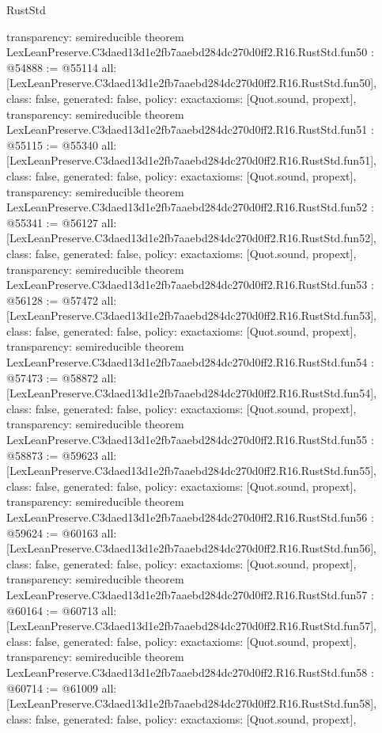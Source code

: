 \begin{lexlean}{RustStd}
\begin{coremodule}
{  transparency: semireducible
}
theorem LexLeanPreserve.C3daed13d1e2fb7aaebd284dc270d0ff2.R16.RustStd.fun50 : @54888 := @55114 {
  all: [LexLeanPreserve.C3daed13d1e2fb7aaebd284dc270d0ff2.R16.RustStd.fun50],
  class: false,
  generated: false,
  policy: exact{axioms: [Quot.sound, propext]},
  transparency: semireducible
}
theorem LexLeanPreserve.C3daed13d1e2fb7aaebd284dc270d0ff2.R16.RustStd.fun51 : @55115 := @55340 {
  all: [LexLeanPreserve.C3daed13d1e2fb7aaebd284dc270d0ff2.R16.RustStd.fun51],
  class: false,
  generated: false,
  policy: exact{axioms: [Quot.sound, propext]},
  transparency: semireducible
}
theorem LexLeanPreserve.C3daed13d1e2fb7aaebd284dc270d0ff2.R16.RustStd.fun52 : @55341 := @56127 {
  all: [LexLeanPreserve.C3daed13d1e2fb7aaebd284dc270d0ff2.R16.RustStd.fun52],
  class: false,
  generated: false,
  policy: exact{axioms: [Quot.sound, propext]},
  transparency: semireducible
}
theorem LexLeanPreserve.C3daed13d1e2fb7aaebd284dc270d0ff2.R16.RustStd.fun53 : @56128 := @57472 {
  all: [LexLeanPreserve.C3daed13d1e2fb7aaebd284dc270d0ff2.R16.RustStd.fun53],
  class: false,
  generated: false,
  policy: exact{axioms: [Quot.sound, propext]},
  transparency: semireducible
}
theorem LexLeanPreserve.C3daed13d1e2fb7aaebd284dc270d0ff2.R16.RustStd.fun54 : @57473 := @58872 {
  all: [LexLeanPreserve.C3daed13d1e2fb7aaebd284dc270d0ff2.R16.RustStd.fun54],
  class: false,
  generated: false,
  policy: exact{axioms: [Quot.sound, propext]},
  transparency: semireducible
}
theorem LexLeanPreserve.C3daed13d1e2fb7aaebd284dc270d0ff2.R16.RustStd.fun55 : @58873 := @59623 {
  all: [LexLeanPreserve.C3daed13d1e2fb7aaebd284dc270d0ff2.R16.RustStd.fun55],
  class: false,
  generated: false,
  policy: exact{axioms: [Quot.sound, propext]},
  transparency: semireducible
}
theorem LexLeanPreserve.C3daed13d1e2fb7aaebd284dc270d0ff2.R16.RustStd.fun56 : @59624 := @60163 {
  all: [LexLeanPreserve.C3daed13d1e2fb7aaebd284dc270d0ff2.R16.RustStd.fun56],
  class: false,
  generated: false,
  policy: exact{axioms: [Quot.sound, propext]},
  transparency: semireducible
}
theorem LexLeanPreserve.C3daed13d1e2fb7aaebd284dc270d0ff2.R16.RustStd.fun57 : @60164 := @60713 {
  all: [LexLeanPreserve.C3daed13d1e2fb7aaebd284dc270d0ff2.R16.RustStd.fun57],
  class: false,
  generated: false,
  policy: exact{axioms: [Quot.sound, propext]},
  transparency: semireducible
}
theorem LexLeanPreserve.C3daed13d1e2fb7aaebd284dc270d0ff2.R16.RustStd.fun58 : @60714 := @61009 {
  all: [LexLeanPreserve.C3daed13d1e2fb7aaebd284dc270d0ff2.R16.RustStd.fun58],
  class: false,
  generated: false,
  policy: exact{axioms: [Quot.sound, propext]},
}
\end{coremodule}
\end{lexlean}
